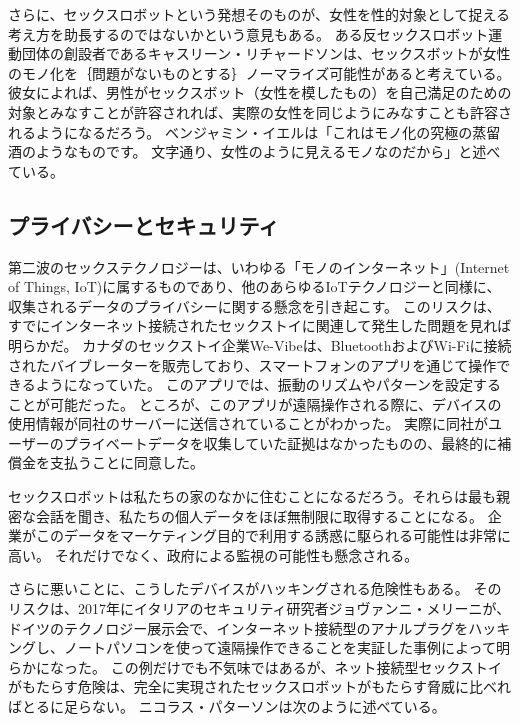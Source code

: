 \documentclass[paper=a4,book,openany]{jlreq}
\newcommand{\ig}[1]{}           %
\begin{document}
さらに、セックスロボットという発想そのものが、女性を性的対象として捉える考え方を助長するのではないかという意見もある。
ある反セックスロボット運動団体の創設者であるキャスリーン・リチャードソン\ig{Kathleen Richardson}は、セックスボットが女性のモノ化を｛問題がないものとする｝{ノーマライズ}可能性があると考えている。
彼女によれば、男性がセックスボット（女性を模したもの）を自己満足のための対象とみなすことが許容されれば、実際の女性を同じようにみなすことも許容されるようになるだろう\citep{richardson16:_asymm_relat}。
ベンジャミン・イエルは「これはモノ化の究極の蒸留酒のようなものです。
文字通り、女性のように見えるモノなのだから」と述べている\citep{mcdonald19:_sex_robot_are_almos_here}。

\subsection{プライバシーとセキュリティ}

第二波のセックステクノロジーは、いわゆる「モノのインターネット」(Internet of Things, IoT)に属するものであり、他のあらゆるIoTテクノロジーと同様に、収集されるデータのプライバシーに関する懸念を引き起こす。
このリスクは、すでにインターネット接続されたセックストイに関連して発生した問題を見れば明らかだ。
カナダのセックストイ企業We-Vibeは、BluetoothおよびWi-Fiに接続されたバイブレーターを販売しており、スマートフォンのアプリを通じて操作できるようになっていた。
このアプリでは、振動のリズムやパターンを設定することが可能だった。
ところが、このアプリが遠隔操作される際に、デバイスの使用情報が同社のサーバーに送信されていることがわかった。
実際に同社がユーザーのプライベートデータを収集していた証拠はなかったものの、最終的に補償金を支払うことに同意した\citep{freytas-tamura17:_maker_smart_vibrat_settl_data}。

セックスロボットは私たちの家のなかに住むことになるだろう。それらは最も親密な会話を聞き、私たちの個人データをほぼ無制限に取得することになる。
企業がこのデータをマーケティング目的で利用する誘惑に駆られる可能性は非常に高い。
それだけでなく、政府による監視の可能性も懸念される。

さらに悪いことに、こうしたデバイスがハッキングされる危険性もある。
そのリスクは、2017年にイタリアのセキュリティ研究者ジョヴァンニ・メリーニが、ドイツのテクノロジー展示会で、インターネット接続型のアナルプラグをハッキングし、ノートパソコンを使って遠隔操作できることを実証した事例によって明らかになった\citep{oberhaus17:_secur_resear_hacked_bluet_enabl_butt_plug}。
この例だけでも不気味ではあるが、ネット接続型セックストイがもたらす危険は、完全に実現されたセックスロボットがもたらす脅威に比べればとるに足らない。
ニコラス・パターソンは次のように述べている。
\end{document}
